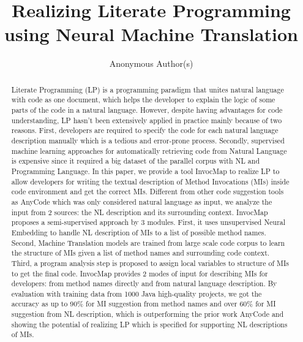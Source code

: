\documentclass[sigconf,review,anonymous]{article}
\title{Realizing Literate Programming using Neural Machine Translation}
\author{%
  Anonymous Author(s)
}
\begin{document}
\maketitle

\begin{abstract}
Literate Programming (LP) is a programming paradigm that unites natural language with code as one document, which helps the developer to explain the logic of some parts of the code in a natural language. However, despite having advantages for code understanding,  LP hasn't been extensively applied in practice mainly because of two reasons. First, developers are required to specify the code for each natural language description manually which is a tedious and error-prone process. Secondly, supervised machine learning approaches for automatically retrieving code from Natural Language is expensive since it required a big dataset of the parallel corpus with NL and Programming Language. In this paper, we provide a tool InvocMap to realize LP to allow developers for writing the textual description of Method Invocations (MIs) inside code environment and get the correct MIs. Different from other code suggestion tools as AnyCode which was only considered natural language as input, we analyze the input from 2 sources: the NL description and its surrounding context. InvocMap proposes a semi-supervised approach by 3 modules. First, it uses unsupervised Neural Embedding to handle NL description of MIs to a list of possible method names. Second, Machine Translation models are trained from large scale code corpus to learn the structure of MIs given a list of method names and surrounding code context. Third, a program analysis step is proposed to assign local variables to structure of MIs to get the final code. InvocMap provides 2 modes of input for describing MIs for developers: from method names directly and from natural language description. By evaluation with training data from 1000 Java high-quality projects, we got the accuracy as up to 90\% for MI suggestion from method names and over 60\% for MI suggestion from NL description, which is outperforming the prior work AnyCode and showing the potential of realizing LP which is specified for supporting NL descriptions of MIs.
\end{abstract}
\end{document}
